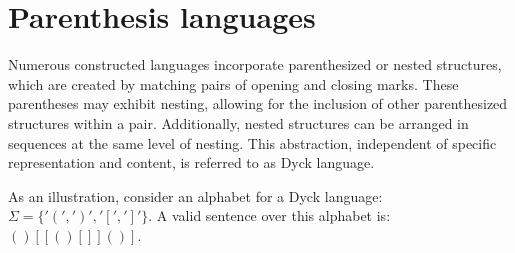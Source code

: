 \section{Parenthesis languages}

Numerous constructed languages incorporate parenthesized or nested structures, which are created by matching pairs of opening and closing marks.
These parentheses may exhibit nesting, allowing for the inclusion of other parenthesized structures within a pair.
Additionally, nested structures can be arranged in sequences at the same level of nesting.
This abstraction, independent of specific representation and content, is referred to as Dyck language.
\begin{example}
    As an illustration, consider an alphabet for a Dyck language: $\Sigma=\{'(',')','[',']'\}$. 
    A valid sentence over this alphabet is: $()[[()[]]()]$.
\end{example}